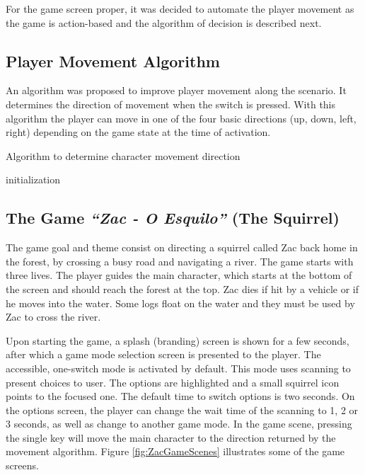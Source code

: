 \documentclass[a4paper]{sbgames}               %
\begin{document}
For the game screen proper, it was decided to automate the player movement as the game is action-based and the algorithm of decision is described next.

\subsection{Player Movement Algorithm}
\label{sec:MovementAlgorithm}
An algorithm was proposed to improve player movement along the scenario. It determines the direction of movement when the switch is pressed. With this algorithm the player can move in one of the four basic directions (up, down, left, right) depending on the game state at the time of activation.

\begin{algorithm}[ht]
\caption{Algorithm to determine character movement direction}
 initialization\;
\end{algorithm}

\subsection{The Game \textit{``Zac - O Esquilo''} (The Squirrel)}
The game goal and theme consist on directing a squirrel called Zac back home in the forest, by crossing a busy road and navigating a river. The game starts with three lives. The player guides the main character, which starts at the bottom of the screen and should reach the forest at the top. Zac dies if hit by a vehicle or if he moves into the water. Some logs float on the water and they must be used by Zac to cross the river.

Upon starting the game, a splash (branding) screen is shown for a few seconds, after which a game mode selection screen is presented to the player. The accessible, one-switch mode is activated by default. This mode uses scanning to present choices to user. The options are highlighted and a small squirrel icon points to the focused one. The default time to switch options is two seconds. On the options screen, the player can change the wait time of the scanning to 1, 2 or 3 seconds, as well as change to another game mode. In the game scene, pressing the single key will move the main character to the direction returned by the movement algorithm. Figure \ref{fig:ZacGameScenes} illustrates some of the game screens.
\end{document}
